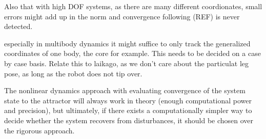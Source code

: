   Also that with high DOF systems, as there are many different coordionates, small errors might add up in the norm and convergence following (REF) is never detected. 

especially in multibody dynamics it might suffice to only track the generalized coordinates of one body, the core for example. This needs to be decided on a case by case basis. 
Relate this to laikago, as we don't care about the particulat leg pose, as long as the robot does not tip over. 

The nonlinear dynamics approach with evaluating convergence of the system state to the attractor will always work in theory (enough computational power and precision), but ultimately, if there exists a computationally simpler way to decide whether the system recovers from disturbances, it should be chosen over the rigorous approach. 
 

    
    

    






